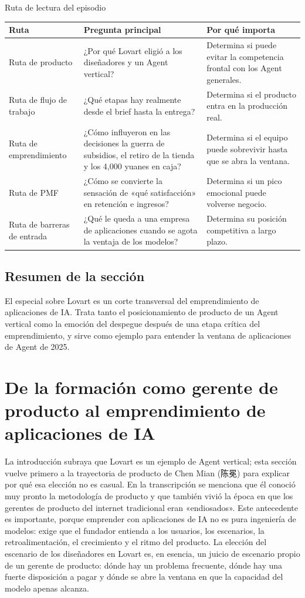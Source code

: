 \documentclass[a4paper]{article}
\begin{document}
\begin{knowledgebox}{Ruta de lectura del episodio}
\begin{tabularx}{\textwidth}{p{}p{}X}
\toprule
Ruta & Pregunta principal & Por qué importa \\
\midrule
Ruta de producto & ¿Por qué Lovart eligió a los diseñadores y un Agent vertical? & Determina si puede evitar la competencia frontal con los Agent generales. \\
Ruta de flujo de trabajo & ¿Qué etapas hay realmente desde el brief hasta la entrega? & Determina si el producto entra en la producción real. \\
Ruta de emprendimiento & ¿Cómo influyeron en las decisiones la guerra de subsidios, el retiro de la tienda y los 4,000 yuanes en caja? & Determina si el equipo puede sobrevivir hasta que se abra la ventana. \\
Ruta de PMF & ¿Cómo se convierte la sensación de «qué satisfacción» en retención e ingresos? & Determina si un pico emocional puede volverse negocio. \\
Ruta de barreras de entrada & ¿Qué le queda a una empresa de aplicaciones cuando se agota la ventaja de los modelos? & Determina su posición competitiva a largo plazo. \\
\bottomrule
\end{tabularx}
\end{knowledgebox}

\subsection{Resumen de la sección}

El especial sobre Lovart es un corte transversal del emprendimiento de aplicaciones de IA. Trata tanto el posicionamiento de producto de un Agent vertical como la emoción del despegue después de una etapa crítica del emprendimiento, y sirve como ejemplo para entender la ventana de aplicaciones de Agent de 2025.
\section{De la formación como gerente de producto al emprendimiento de aplicaciones de IA}

La introducción subraya que Lovart es un ejemplo de Agent vertical; esta sección vuelve primero a la trayectoria de producto de Chen Mian (陈冕) para explicar por qué esa elección no es casual. En la transcripción se menciona que él conoció muy pronto la metodología de producto y que también vivió la época en que los gerentes de producto del internet tradicional eran «endiosados». Este antecedente es importante, porque emprender con aplicaciones de IA no es pura ingeniería de modelos: exige que el fundador entienda a los usuarios, los escenarios, la retroalimentación, el crecimiento y el ritmo del producto. La elección del escenario de los diseñadores en Lovart es, en esencia, un juicio de escenario propio de un gerente de producto: dónde hay un problema frecuente, dónde hay una fuerte disposición a pagar y dónde se abre la ventana en que la capacidad del modelo apenas alcanza.
\end{document}
